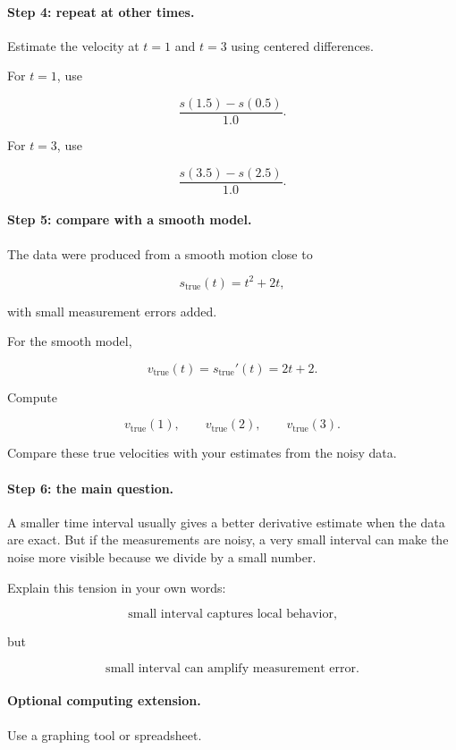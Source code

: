 \paragraph{Step 4: repeat at other times.}
Estimate the velocity at \(t=1\) and \(t=3\) using centered differences.

For \(t=1\), use

\[
\frac{s(1.5)-s(0.5)}{1.0}.
\]

For \(t=3\), use

\[
\frac{s(3.5)-s(2.5)}{1.0}.
\]

\paragraph{Step 5: compare with a smooth model.}
The data were produced from a smooth motion close to

\[
s_{\text{true}}(t)=t^2+2t,
\]

with small measurement errors added.

For the smooth model,

\[
v_{\text{true}}(t)=s_{\text{true}}'(t)=2t+2.
\]

Compute

\[
v_{\text{true}}(1),\qquad v_{\text{true}}(2),\qquad v_{\text{true}}(3).
\]

Compare these true velocities with your estimates from the noisy data.

\paragraph{Step 6: the main question.}
A smaller time interval usually gives a better derivative estimate when the data are exact.  But if the measurements are noisy, a very small interval can make the noise more visible because we divide by a small number.

Explain this tension in your own words:

\[
\text{small interval captures local behavior,}
\]

but

\[
\text{small interval can amplify measurement error.}
\]

\paragraph{Optional computing extension.}
Use a graphing tool or spreadsheet.

